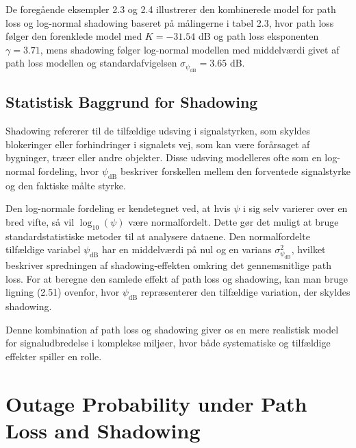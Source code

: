 \documentclass[a4paper,12pt]{book}
\begin{document}
	De foregående eksempler 2.3 og 2.4 illustrerer den kombinerede model for path loss og log-normal shadowing baseret på målingerne i tabel 2.3, hvor path loss følger den forenklede model med \( K = -31.54 \) dB og path loss eksponenten \( \gamma = 3.71 \), mens shadowing følger log-normal modellen med middelværdi givet af path loss modellen og standardafvigelsen \( \sigma_{\psi_{\text{dB}}} = 3.65 \) dB.
	
	\subsection{Statistisk Baggrund for Shadowing}
	Shadowing refererer til de tilfældige udsving i signalstyrken, som skyldes blokeringer eller forhindringer i signalets vej, som kan være forårsaget af bygninger, træer eller andre objekter. Disse udsving modelleres ofte som en log-normal fordeling, hvor \( \psi_{\text{dB}} \) beskriver forskellen mellem den forventede signalstyrke og den faktiske målte styrke.
	
	Den log-normale fordeling er kendetegnet ved, at hvis \( \psi \) i sig selv varierer over en bred vifte, så vil \( \log_{10}(\psi) \) være normalfordelt. Dette gør det muligt at bruge standardstatistiske metoder til at analysere dataene. Den normalfordelte tilfældige variabel \( \psi_{\text{dB}} \) har en middelværdi på nul og en varians \( \sigma^2_{\psi_{\text{dB}}} \), hvilket beskriver spredningen af shadowing-effekten omkring det gennemsnitlige path loss.
	\newline\newline
	For at beregne den samlede effekt af path loss og shadowing, kan man bruge ligning (2.51) ovenfor, hvor \( \psi_{\text{dB}} \) repræsenterer den tilfældige variation, der skyldes shadowing.
	
	
	Denne kombination af path loss og shadowing giver os en mere realistisk model for signaludbredelse i komplekse miljøer, hvor både systematiske og tilfældige effekter spiller en rolle.
	
	\section{Outage Probability under Path Loss and Shadowing}
	
\end{document}

